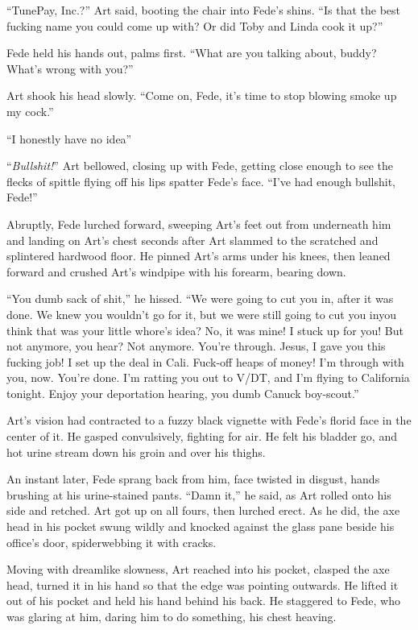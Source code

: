 “TunePay, Inc.?” Art said, booting the chair into Fede’s shins. “Is
that the best fucking name you could come up with? Or did Toby and
Linda cook it up?”

Fede held his hands out, palms first. “What are you talking about,
buddy? What’s wrong with you?”

Art shook his head slowly. “Come on, Fede, it’s time to stop
blowing smoke up my cock.”

“I honestly have no idea{\dash}”

“\emph{Bullshit!}” Art bellowed, closing up with Fede, getting
close enough to see the flecks of spittle flying off his lips
spatter Fede’s face. “I’ve had enough bullshit, Fede!”

Abruptly, Fede lurched forward, sweeping Art’s feet out from
underneath him and landing on Art’s chest seconds after Art slammed
to the scratched and splintered hardwood floor. He pinned Art’s
arms under his knees, then leaned forward and crushed Art’s
windpipe with his forearm, bearing down.

“You dumb sack of shit,” he hissed. “We were going to cut you in,
after it was done. We knew you wouldn’t go for it, but we were
still going to cut you in{\dash}you think that was your little whore’s
idea? No, it was mine! I stuck up for you! But not anymore, you
hear? Not anymore. You’re through. Jesus, I gave you this fucking
job! I set up the deal in Cali. Fuck-off heaps of money! I’m
through with you, now. You’re done. I’m ratting you out to V/DT,
and I’m flying to California tonight. Enjoy your deportation
hearing, you dumb Canuck boy-scout.”

Art’s vision had contracted to a fuzzy black vignette with Fede’s
florid face in the center of it. He gasped convulsively, fighting
for air. He felt his bladder go, and hot urine stream down his
groin and over his thighs.

An instant later, Fede sprang back from him, face twisted in
disgust, hands brushing at his urine-stained pants. “Damn it,” he
said, as Art rolled onto his side and retched. Art got up on all
fours, then lurched erect. As he did, the axe head in his pocket
swung wildly and knocked against the glass pane beside his office’s
door, spiderwebbing it with cracks.

Moving with dreamlike slowness, Art reached into his pocket,
clasped the axe head, turned it in his hand so that the edge was
pointing outwards. He lifted it out of his pocket and held his hand
behind his back. He staggered to Fede, who was glaring at him,
daring him to do something, his chest heaving.

